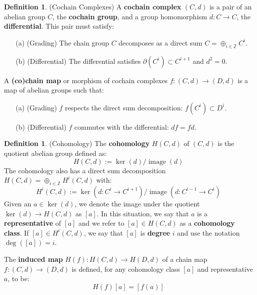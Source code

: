 \documentclass[12pt]{article}
\theoremstyle{definition}
\newtheorem{definition}[theorem]{Definition}
\numberwithin{equation}{section}
\newcommand{\Z}{{\mathbb Z}}
\newcommand{\op}{\operatorname}
\begin{document}
\begin{definition} \label{def:cochain_complex} (Cochain Complexes) A {\bf cochain complex} $(C,d)$ is a pair of an abelian group $C$, the {\bf cochain group}, and a group homomorphism $d:C \to C$, the {\bf differential}. This pair must satisfy:
\begin{itemize}
\item[(a)] (Grading) The chain group $C$ decomposes as a direct sum $C = \oplus_{i \in \Z} C^i$.
\item[(b)] (Differential) The differential satisfies $\partial(C^i) \subset C^{i+1}$ and $d^2 = 0$.
\end{itemize}
A {\bf (co)chain map} or morphism of cochain complexes $f:(C,d) \to (D,d)$ is a map of abelian groups such that:
\begin{itemize}
\item[(a)] (Grading) $f$ respects the direct sum decomposition: $f(C^i) \subset D^i$.
\item[(b)] (Differential) $f$ commutes with the differential: $d f = f d$.
\end{itemize}
\end{definition}
\begin{definition} \label{def:cohomology} (Cohomology) The {\bf cohomology} $H(C,d)$ of $(C,d)$ is the quotient abelian group defined as:
\[
H(C,d) := \op{ker}(d)/\op{image}(d)
\] The cohomology also has a direct sum decomposition $H(C,d) = \oplus_{i \in \Z} H^i(C,d)$ with:
\[
H^i(C,d) := \op{ker}(d:C^i \to C^{i+1})/\op{image}(d:C^{i-1} \to C^i)
\]
Given an $a \in \op{ker}(d)$, we denote the image under the quotient $\op{ker}(d) \to H(C,d)$ as $[a]$. In this situation, we say that $a$ is a {\bf representative} of $[a]$ and we refer to $[a] \in H(C,d)$ as a {\bf cohomology class}. If $[a] \in H^i(C,d)$, we say that $[a]$ is {\bf degree} $i$ and use the notation $\op{deg}([a]) = i$. 

The {\bf induced map} $H(f):H(C,d) \to H(D,d)$ of a chain map $f:(C,d) \to (D,d)$ is defined, for any cohomology class $[a]$ and representative $a$, to be:
\[
H(f)[a] = [f(a)]
\]
\end{definition}
\end{document}
